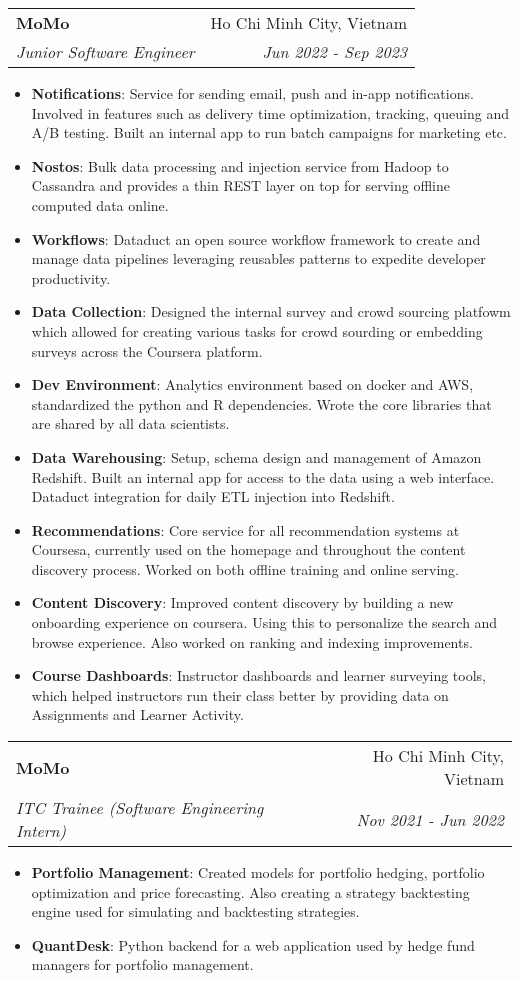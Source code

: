 \documentclass[letterpaper,11pt]{article}
\makeatletter
\newcommand{\resumeItem}[2]{
    \item\small{
        \textbf{#1}{: #2 \vspace{-2pt}}
    }
}
\newcommand{\resumeSubheading}[4]{
    \vspace{-1pt}\item
    \begin{tabular*}{0.97\textwidth}{l@{\extracolsep{\fill}}r}
    \textbf{#1} & #2 \\
    \textit{\small#3} & \textit{\small #4} \\
    \end{tabular*}\vspace{-5pt}
}
\newcommand{\resumeItemListStart}{\begin{itemize}}
\newcommand{\resumeItemListEnd}{\end{itemize}\vspace{-5pt}}
\makeatother
\begin{document}
    \resumeSubheading
    {MoMo}{Ho Chi Minh City, Vietnam}
    {Junior Software Engineer}{Jun 2022 - Sep 2023}
    \resumeItemListStart
    \resumeItem{Notifications}
    {Service for sending email, push and in-app notifications. Involved in features such as delivery time optimization, tracking, queuing and A/B testing. Built an internal app to run batch campaigns for marketing etc.}
    \resumeItem{Nostos}
    {Bulk data processing and injection service from Hadoop to Cassandra and provides a thin REST layer on top for serving offline computed data online.}
    \resumeItem{Workflows}
    {Dataduct an open source workflow framework to create and manage data pipelines leveraging reusables patterns to expedite developer productivity.}
    \resumeItem{Data Collection}
    {Designed the internal survey and crowd sourcing platfowm which allowed for creating various tasks for crowd sourding or embedding surveys across the Coursera platform.}
    \resumeItem{Dev Environment}
    {Analytics environment based on docker and AWS, standardized the python and R dependencies. Wrote the core libraries that are shared by all data scientists.}
    \resumeItem{Data Warehousing}
    {Setup, schema design and management of Amazon Redshift. Built an internal app for access to the data using a web interface. Dataduct integration for daily ETL injection into Redshift.}
    \resumeItem{Recommendations}
    {Core service for all recommendation systems at Coursesa, currently used on the homepage and throughout the content discovery process. Worked on both offline training and online serving.}
    \resumeItem{Content Discovery}
    {Improved content discovery by building a new onboarding experience on coursera. Using this to personalize the search and browse experience. Also worked on ranking and indexing improvements.}
    \resumeItem{Course Dashboards}
    {Instructor dashboards and learner surveying tools, which helped instructors run their class better by providing data on Assignments and Learner Activity.}
    \resumeItemListEnd

    \resumeSubheading
    {MoMo}{Ho Chi Minh City, Vietnam}
    {ITC Trainee (Software Engineering Intern)}{Nov 2021 - Jun 2022}
    \resumeItemListStart
    \resumeItem{Portfolio Management}
    {Created models for portfolio hedging,  portfolio optimization and price forecasting. Also creating a strategy backtesting engine used for simulating and backtesting strategies.}
    \resumeItem{QuantDesk}
    {Python backend for a web application used by hedge fund managers for portfolio management.}
    \resumeItemListEnd
\end{document}
